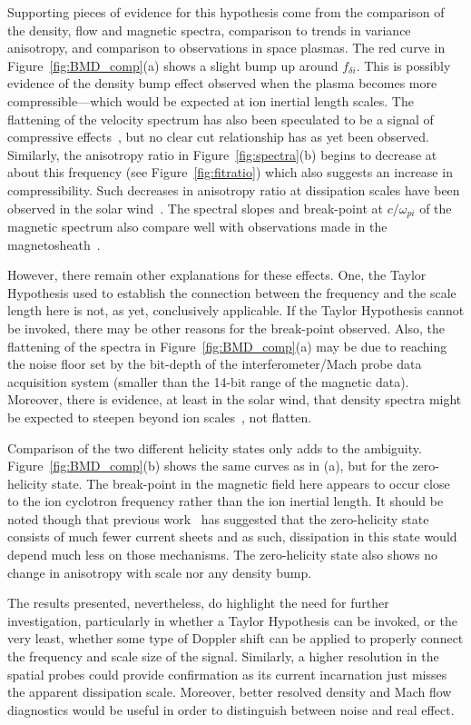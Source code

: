 \documentclass[manuscript]{aastex}
\begin{document}
Supporting pieces of evidence for this hypothesis come from the comparison of the density, flow and magnetic spectra, comparison to trends in variance anisotropy, and comparison to observations in space plasmas. The red curve in Figure~\ref{fig:BMD_comp}(a) shows a slight bump up around $f_{\delta i}$. This is possibly evidence of the density bump effect observed when the plasma becomes more compressible---which would be expected at ion inertial length scales. The flattening of the velocity spectrum has also been speculated to be a signal of compressive effects~\citep{rob10}, but no clear cut relationship has as yet been observed. Similarly, the anisotropy ratio in Figure~\ref{fig:spectra}(b) begins to decrease at about this frequency (see Figure~\ref{fig:fitratio}) which also suggests an increase in compressibility. Such decreases in anisotropy ratio at dissipation scales have been observed in the solar wind~\citep{ham08,kiy13}. The spectral slopes and break-point at $c/\omega_{pi}$ of the magnetic spectrum also compare well with observations made in the magnetosheath~\citep{yor08}.

However, there remain other explanations for these effects. One, the Taylor Hypothesis used to establish the connection between the frequency and the scale length here is not, as yet, conclusively applicable. If the Taylor Hypothesis cannot be invoked, there may be other reasons for the break-point observed. Also, the flattening of the spectra in Figure~\ref{fig:BMD_comp}(a) may be due to reaching the noise floor set by the bit-depth of the interferometer/Mach probe data acquisition system (smaller than the 14-bit range of the magnetic data). Moreover, there is evidence, at least in the solar wind, that density spectra might be expected to steepen beyond ion scales~\citep{che12}, not flatten.

Comparison of the two different helicity states only adds to the ambiguity. Figure~\ref{fig:BMD_comp}(b) shows the same curves as in (a), but for the zero-helicity state. The break-point in the magnetic field here appears to occur close to the ion cyclotron frequency rather than the ion inertial length. It should be noted though that previous work~\citep{sch14b} has suggested that the zero-helicity state consists of much fewer current sheets and as such, dissipation in this state would depend much less on those mechanisms. The zero-helicity state also shows no change in anisotropy with scale nor any density bump.

The results presented, nevertheless, do highlight the need for further investigation, particularly in whether a Taylor Hypothesis can be invoked, or the very least, whether some type of Doppler shift can be applied to properly connect the frequency and scale size of the signal. Similarly, a higher resolution in the spatial probes could provide confirmation as its current incarnation just misses the apparent dissipation scale. Moreover, better resolved density and Mach flow diagnostics would be useful in order to distinguish between noise and real effect.
\end{document}
